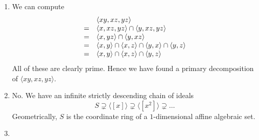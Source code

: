 \documentclass{article}
\newcommand\quotient[2]{{^{\displaystyle #1}}/{_{\displaystyle #2}}}
\begin{document}
\begin{enumerate}[style=nextline,label={Problem (\arabic*)}]
{\begin{enumerate}[label={(\alph*)}]
{\[
R \supseteq \langle a \rangle \supseteq \langle a^2 \rangle \supseteq \ldots
\]
This chain must eventually stabilize. Hence there is $n \in \mathbb{N}$ with $\langle a^n \rangle = \langle a^{n + 1} \rangle$. In particular, we have $a^n \in \langle a^{n + 1} \rangle$. This means that there is $b \in R$ with $a^n = b a^{n + 1}$, hence $0 = b a^{n + 1} - a^n = a^n \left( b a - 1 \right)$. Since $a \neq 0$ and $R$ is a domain, we must in fact have $0 = b a - 1$, hence $1 = b a$. Hence $a$ is a unit. Since every nonzero unit of $R$ is invertible, $R$ is a field.
\par
Now we will show that in an Artinian ring every prime ideal is maximal.
\par
Let $R$ be Artinian and $\mathfrak{p} \subseteq R$ be a prime ideal. Then $\quotient{R}{\mathfrak{p}}$ is an Artinian domain. By the first part, $\quotient{R}{\mathfrak{p}}$ is in fact a field. Hence $\mathfrak{p} \subseteq R$ is in fact a maximal ideal.
}
\item {
We can compute
\[
\begin{array}{>{\displaystyle}c>{\displaystyle}l}
& \langle xy, xz, yz \rangle \\
= & \langle x, xz, yz \rangle \cap \langle y, xz, yz \rangle \\
= & \langle x, yz \rangle \cap \langle y, xz \rangle \\
= & \langle x, y \rangle \cap \langle x, z \rangle \cap \langle y, x \rangle \cap \langle y, z \rangle \\
= & \langle x, y \rangle \cap \langle x, z \rangle \cap \langle y, z \rangle
\end{array}
\]
All of these are clearly prime. Hence we have found a primary decomposition of $\langle xy, xz, yz \rangle$.
}
\item {
No. We have an infinite strictly descending chain of ideals
\[
S \supsetneq \langle [x] \rangle \supsetneq \langle [x^2] \rangle \supsetneq \ldots
\]
Geometrically, $S$ is the coordinate ring of a $1$-dimensional affine algebraic set.
}
\item {
}
\end{enumerate}
}
\end{enumerate}
\end{document}
